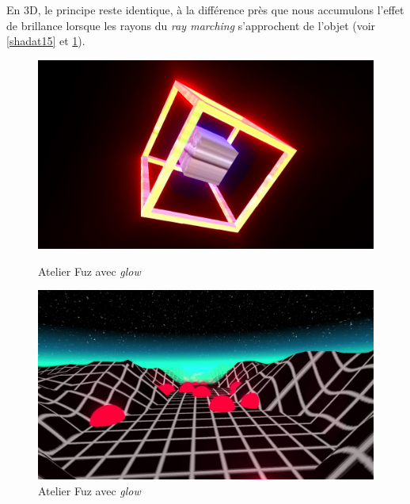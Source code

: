 En 3D, le principe reste identique, à la différence près que nous accumulons l'effet de brillance lorsque les rayons du \textit{ray marching} s'approchent de l'objet (voir \ref{shadat15} et \ref{shadat14}).

\begin{figure}[h]
  \begin{minipage}[b]{0.45\linewidth}
    \centering
    \includegraphics[width=\linewidth]{images/shaders/shaderatelier_15.jpg}
    \caption{Atelier Fuz avec \textit{glow}}
    \label{shadat15}
  \end{minipage}
  \hspace{0.1\linewidth} %
  \begin{minipage}[b]{0.45\linewidth}
    \centering
    \includegraphics[width=\linewidth]{images/shaders/shaderatelier_14.jpg}
    \caption{Atelier Fuz avec \textit{glow}}
    \label{shadat14}
  \end{minipage}
\end{figure}

